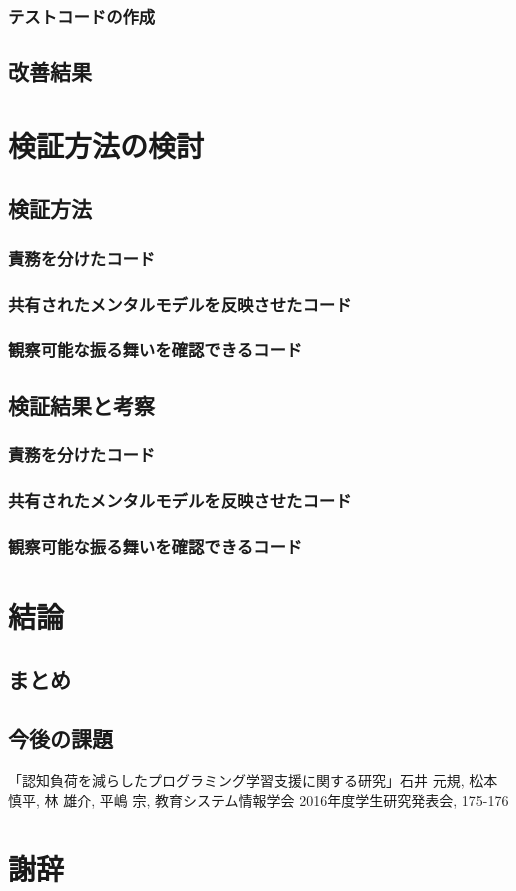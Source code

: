 \documentclass[11pt, a4paper]{jreport}
\begin{document}
\subsection{テストコードの作成}
\section{改善結果}
\chapter{検証方法の検討}
\section{検証方法}
\subsection{責務を分けたコード}
\subsection{共有されたメンタルモデルを反映させたコード}
\subsection{観察可能な振る舞いを確認できるコード}
\section{検証結果と考察}
\subsection{責務を分けたコード}
\subsection{共有されたメンタルモデルを反映させたコード}
\subsection{観察可能な振る舞いを確認できるコード}
\chapter{結論}
\section{まとめ}
\section{今後の課題}

\renewcommand{\bibname}{参考文献}
\begin{thebibliography}{10}
「認知負荷を減らしたプログラミング学習支援に関する研究」石井 元規, 松本 慎平, 林 雄介, 平嶋 宗, 教育システム情報学会 2016年度学生研究発表会, 175-176
\end{thebibliography}

\chapter*{謝辞}
\end{document}
